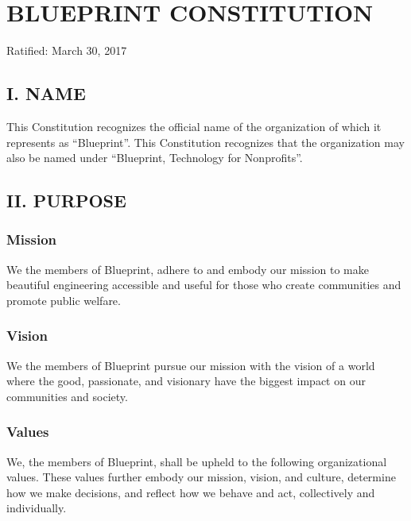 \documentclass[
]{article}
\author{}
\date{}
\begin{document}
\hypertarget{blueprint-constitution}{%
\section{BLUEPRINT CONSTITUTION}\label{blueprint-constitution}}

Ratified: March 30, 2017

\hypertarget{i.-name}{%
\subsection{I. NAME}\label{i.-name}}

This Constitution recognizes the official name of the organization of
which it represents as ``Blueprint''. This Constitution recognizes that
the organization may also be named under ``Blueprint, Technology for
Nonprofits''.

\hypertarget{ii.-purpose}{%
\subsection{II. PURPOSE}\label{ii.-purpose}}

\hypertarget{mission}{%
\subsubsection{Mission}\label{mission}}

We the members of Blueprint, adhere to and embody our mission to make
beautiful engineering accessible and useful for those who create
communities and promote public welfare.

\hypertarget{vision}{%
\subsubsection{Vision}\label{vision}}

We the members of Blueprint pursue our mission with the vision of a
world where the good, passionate, and visionary have the biggest impact
on our communities and society.

\hypertarget{values}{%
\subsubsection{Values}\label{values}}

We, the members of Blueprint, shall be upheld to the following
organizational values. These values further embody our mission, vision,
and culture, determine how we make decisions, and reflect how we behave
and act, collectively and individually.
\end{document}
